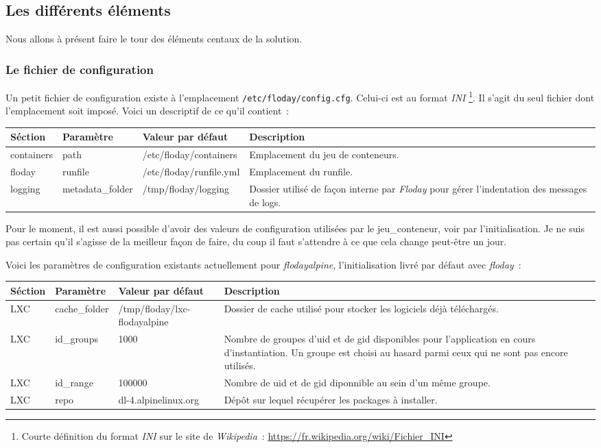 \subsection{Les différents éléments}

Nous allons à présent faire le tour des éléments centaux de la solution.

\subsubsection{Le fichier de configuration}
Un petit fichier de configuration existe à l'emplacement {\tt/etc/floday/config.cfg}.
Celui-ci est au format \emph{INI}%
\footnote{Courte définition du format \emph{INI} sur le site de \emph{Wikipedia}~:
	\url{https://fr.wikipedia.org/wiki/Fichier_INI}
}.
Il s'agit du seul fichier dont l'emplacement soit imposé.
Voici un descriptif de ce qu'il contient~:
\newline

\begin{tabular}{|l|l|p{4cm}|p{4.1cm}|}
	\hline
	Séction & Paramètre & Valeur par défaut & Description \\
	\hline
	containers & path & /etc/floday/containers & Emplacement du jeu de conteneurs.\\
	floday & runfile & /etc/floday/runfile.yml & Emplacement du \gls{runfile}. \\
	logging & metadata\_folder & /tmp/floday/logging & Dossier utilisé de façon interne par \emph{Floday} pour gérer l'indentation des messages de logs. \\
	\hline
\end{tabular}
\newline

Pour le moment, il est aussi possible d'avoir des valeurs de configuration utilisées par le \gls{jeu_conteneur}, voir par l'\gls{initialisation}.
Je ne suis pas certain qu'il s'agisse de la meilleur façon de faire, du coup il faut s'attendre à ce que cela change peut-être un jour.

Voici les paramètres de configuration existants actuellement pour  \emph{flodayalpine}, l'initialisation livré par défaut avec \emph{floday}~:
\newline

\begin{tabular}{|l|l|p{4cm}|p{5.25cm}|}
	\hline
	Séction & Paramètre & Valeur par défaut & Description \\
	\hline
	LXC & cache\_folder & /tmp/floday/lxc-flodayalpine & Dossier de cache utilisé pour stocker les logiciels déjà téléchargés.\\
	LXC & id\_groups & 1000 & Nombre de groupes d'uid et de gid disponibles pour l'\gls{application} en cours d'\gls{instantiation}. Un groupe est choisi au hasard parmi ceux qui ne sont pas encore utilisés.\\
	LXC & id\_range & 100000 & Nombre de uid et de gid diponnible au sein d'un même groupe.\\
	LXC & repo & dl-4.alpinelinux.org & Dépôt sur lequel récupérer les packages à installer.\\
	\hline
\end{tabular}
\newline

